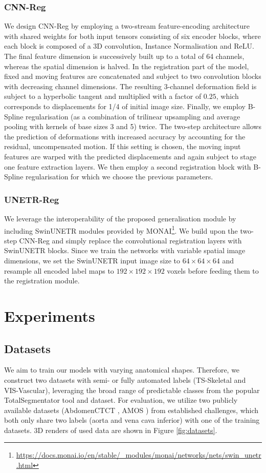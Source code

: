 \subsubsection*{CNN-Reg}
We design CNN-Reg by employing a two-stream feature-encoding architecture with shared weights for both input tensors consisting of six encoder blocks, where each block is composed of a 3D convolution, Instance Normalisation and ReLU. The final feature dimension is successively built up to a total of 64 channels, whereas the spatial dimension is halved. In the registration part of the model, fixed and moving features are concatenated and subject to two convolution blocks with decreasing channel dimensions. The resulting 3-channel deformation field is subject to a hyperbolic tangent and multiplied with a factor of $0.25$, which corresponds to displacements for 1/4 of initial image size. Finally, we employ B-Spline regularisation (as a combination of trilinear upsampling and average pooling with kernels of base sizes 3 and 5) twice.
The two-step architecture allows the prediction of deformations with increased accuracy by accounting for the residual, uncompensated motion. If this setting is chosen, the moving input features are warped with the predicted displacements and again subject to stage one feature extraction layers. We then employ a second registration block with B-Spline regularisation for which we choose the previous parameters.

\subsubsection*{UNETR-Reg}
We leverage the interoperability of the proposed generalisation module by including SwinUNETR \citep{Hatamizadeh2022SWINUNETR} modules provided by MONAI\footnote{\url{https://docs.monai.io/en/stable/_modules/monai/networks/nets/swin_unetr.html}}. We build upon the two-step CNN-Reg and simply replace the convolutional registration layers with SwinUNETR blocks. Since we train the networks with variable spatial image dimensions, we set the SwinUNETR input image size to $64\times64\times64$ and resample all encoded label maps to $192\times192\times192$ voxels before feeding them to the registration module.


\section{Experiments}
\subsection{Datasets}
\label{sec:datasets}
We aim to train our models with varying anatomical shapes. Therefore, we construct two datasets with semi- or fully automated labels (TS-Skeletal and VIS-Vascular), leveraging the broad range of predictable classes from the popular TotalSegmentator tool and dataset. For evaluation, we utilize two publicly available datasets (AbdomenCTCT \citep{L2R}, AMOS \citep{AMOS}) from established challenges, which both only share two labels (aorta and vena cava inferior) with one of the training datasets.
3D renders of used data are shown in Figure \ref{fig:datasets}.


